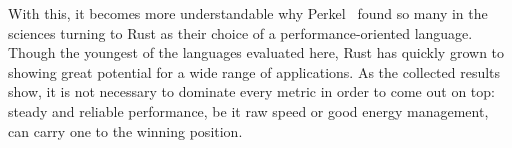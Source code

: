 With this, it becomes more understandable why Perkel~\cite{nature} found so many in the sciences turning to Rust as their choice of a performance-oriented language. Though the youngest of the languages evaluated here, Rust has quickly grown to showing great potential for a wide range of applications. As the collected results show, it is not necessary to dominate every metric in order to come out on top: steady and reliable performance, be it raw speed or good energy management, can carry one to the winning position.
